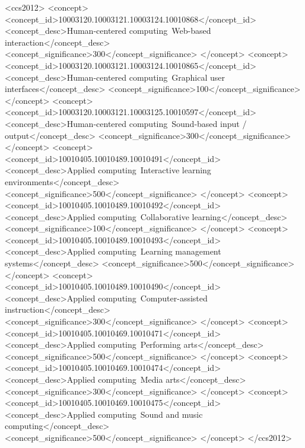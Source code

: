 \documentclass[manuscript,screen,review]{acmart}
\begin{document}
\begin{CCSXML}
<ccs2012>
   <concept>
       <concept_id>10003120.10003121.10003124.10010868</concept_id>
       <concept_desc>Human-centered computing~Web-based interaction</concept_desc>
       <concept_significance>300</concept_significance>
       </concept>
   <concept>
       <concept_id>10003120.10003121.10003124.10010865</concept_id>
       <concept_desc>Human-centered computing~Graphical user interfaces</concept_desc>
       <concept_significance>100</concept_significance>
       </concept>
   <concept>
       <concept_id>10003120.10003121.10003125.10010597</concept_id>
       <concept_desc>Human-centered computing~Sound-based input / output</concept_desc>
       <concept_significance>300</concept_significance>
       </concept>
   <concept>
       <concept_id>10010405.10010489.10010491</concept_id>
       <concept_desc>Applied computing~Interactive learning environments</concept_desc>
       <concept_significance>500</concept_significance>
       </concept>
   <concept>
       <concept_id>10010405.10010489.10010492</concept_id>
       <concept_desc>Applied computing~Collaborative learning</concept_desc>
       <concept_significance>100</concept_significance>
       </concept>
   <concept>
       <concept_id>10010405.10010489.10010493</concept_id>
       <concept_desc>Applied computing~Learning management systems</concept_desc>
       <concept_significance>500</concept_significance>
       </concept>
   <concept>
       <concept_id>10010405.10010489.10010490</concept_id>
       <concept_desc>Applied computing~Computer-assisted instruction</concept_desc>
       <concept_significance>300</concept_significance>
       </concept>
   <concept>
       <concept_id>10010405.10010469.10010471</concept_id>
       <concept_desc>Applied computing~Performing arts</concept_desc>
       <concept_significance>500</concept_significance>
       </concept>
   <concept>
       <concept_id>10010405.10010469.10010474</concept_id>
       <concept_desc>Applied computing~Media arts</concept_desc>
       <concept_significance>300</concept_significance>
       </concept>
   <concept>
       <concept_id>10010405.10010469.10010475</concept_id>
       <concept_desc>Applied computing~Sound and music computing</concept_desc>
       <concept_significance>500</concept_significance>
       </concept>
 </ccs2012>
\end{CCSXML}
\end{document}
